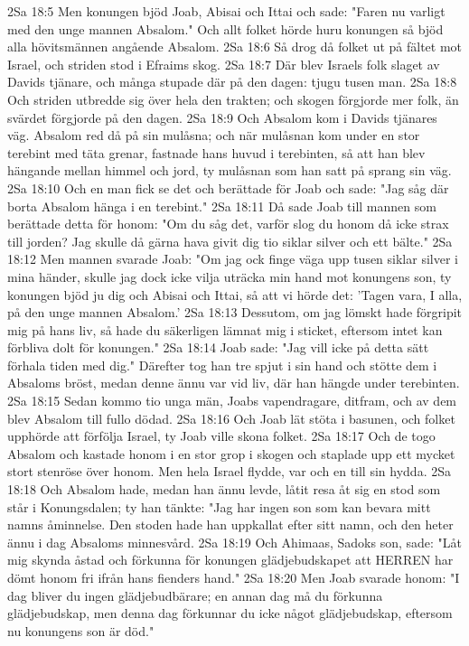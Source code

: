 2Sa 18:5  Men konungen bjöd Joab, Abisai och Ittai och sade: "Faren nu varligt med den unge mannen Absalom." Och allt folket hörde huru konungen så bjöd alla hövitsmännen angående Absalom.
2Sa 18:6  Så drog då folket ut på fältet mot Israel, och striden stod i Efraims skog.
2Sa 18:7  Där blev Israels folk slaget av Davids tjänare, och många stupade där på den dagen: tjugu tusen man.
2Sa 18:8  Och striden utbredde sig över hela den trakten; och skogen förgjorde mer folk, än svärdet förgjorde på den dagen.
2Sa 18:9  Och Absalom kom i Davids tjänares väg. Absalom red då på sin mulåsna; och när mulåsnan kom under en stor terebint med täta grenar, fastnade hans huvud i terebinten, så att han blev hängande mellan himmel och jord, ty mulåsnan som han satt på sprang sin väg.
2Sa 18:10  Och en man fick se det och berättade för Joab och sade: "Jag såg där borta Absalom hänga i en terebint."
2Sa 18:11  Då sade Joab till mannen som berättade detta för honom: "Om du såg det, varför slog du honom då icke strax till jorden? Jag skulle då gärna hava givit dig tio siklar silver och ett bälte."
2Sa 18:12  Men mannen svarade Joab: "Om jag ock finge väga upp tusen siklar silver i mina händer, skulle jag dock icke vilja uträcka min hand mot konungens son, ty konungen bjöd ju dig och Abisai och Ittai, så att vi hörde det: 'Tagen vara, I alla, på den unge mannen Absalom.'
2Sa 18:13  Dessutom, om jag lömskt hade förgripit mig på hans liv, så hade du säkerligen lämnat mig i sticket, eftersom intet kan förbliva dolt för konungen."
2Sa 18:14  Joab sade: "Jag vill icke på detta sätt förhala tiden med dig." Därefter tog han tre spjut i sin hand och stötte dem i Absaloms bröst, medan denne ännu var vid liv, där han hängde under terebinten.
2Sa 18:15  Sedan kommo tio unga män, Joabs vapendragare, ditfram, och av dem blev Absalom till fullo dödad.
2Sa 18:16  Och Joab lät stöta i basunen, och folket upphörde att förfölja Israel, ty Joab ville skona folket.
2Sa 18:17  Och de togo Absalom och kastade honom i en stor grop i skogen och staplade upp ett mycket stort stenröse över honom. Men hela Israel flydde, var och en till sin hydda.
2Sa 18:18  Och Absalom hade, medan han ännu levde, låtit resa åt sig en stod som står i Konungsdalen; ty han tänkte: "Jag har ingen son som kan bevara mitt namns åminnelse. Den stoden hade han uppkallat efter sitt namn, och den heter ännu i dag Absaloms minnesvård.
2Sa 18:19  Och Ahimaas, Sadoks son, sade: "Låt mig skynda åstad och förkunna för konungen glädjebudskapet att HERREN har dömt honom fri ifrån hans fienders hand."
2Sa 18:20  Men Joab svarade honom: "I dag bliver du ingen glädjebudbärare; en annan dag må du förkunna glädjebudskap, men denna dag förkunnar du icke något glädjebudskap, eftersom nu konungens son är död."

